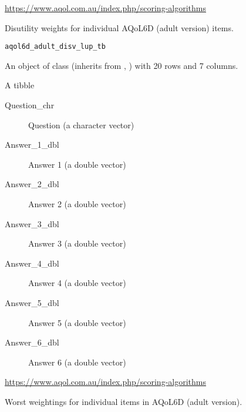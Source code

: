 \documentclass[a4paper]{book}
\begin{document}
%
\begin{Source}\relax
\url{https://www.aqol.com.au/index.php/scoring-algorithms}
\end{Source}
%
\begin{Description}\relax
Disutility weights for individual AQoL6D (adult version) items.
\end{Description}
%
\begin{Usage}
\begin{verbatim}
aqol6d_adult_disv_lup_tb
\end{verbatim}
\end{Usage}
%
\begin{Format}
An object of class  (inherits from , ) with 20 rows and 7 columns.
\end{Format}
%
\begin{Details}\relax
A tibble

\begin{description}

\item[Question\_chr] Question (a character vector)
\item[Answer\_1\_dbl] Answer 1 (a double vector)
\item[Answer\_2\_dbl] Answer 2 (a double vector)
\item[Answer\_3\_dbl] Answer 3 (a double vector)
\item[Answer\_4\_dbl] Answer 4 (a double vector)
\item[Answer\_5\_dbl] Answer 5 (a double vector)
\item[Answer\_6\_dbl] Answer 6 (a double vector)

\end{description}

\end{Details}
%
\begin{Source}\relax
\url{https://www.aqol.com.au/index.php/scoring-algorithms}
\end{Source}
%
\begin{Description}\relax
Worst weightings for individual items in AQoL6D (adult version).
\end{Description}
\end{document}
